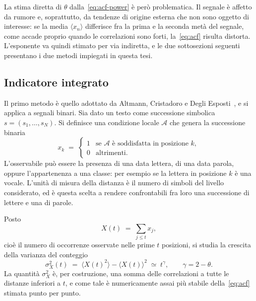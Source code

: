 La stima diretta di $\theta$ dalla~\eqref{eq:acf-power} è però problematica. Il
segnale è affetto da rumore e, soprattutto, da tendenze di origine esterna che
non sono oggetto di interesse: se la media $\langle x_n\rangle$ differisce fra
la prima e la seconda metà del segnale, come accade proprio quando le
correlazioni sono forti, la~\eqref{eq:acf} risulta distorta. L'esponente va
quindi stimato per via indiretta, e le due sottosezioni seguenti presentano i
due metodi impiegati in questa tesi.

\subsection{Indicatore integrato}
\label{sec:integrato}

Il primo metodo è quello adottato da Altmann, Cristadoro e Degli
Esposti~\cite{altmann2012}, e si applica a segnali binari. Sia dato un testo
come successione simbolica $s = (s_1,\dots,s_N)$. Si definisce una condizione
locale $\mathcal{A}$ che genera la successione binaria
\begin{equation}
  x_k \;=\;
  \begin{cases}
    1 & \text{se $\mathcal{A}$ è soddisfatta in posizione $k$},\\
    0 & \text{altrimenti}.
  \end{cases}
  \label{eq:osservabile}
\end{equation}
L'osservabile può essere la presenza di una data lettera, di una data parola,
oppure l'appartenenza a una classe: per esempio se la lettera in posizione $k$ è
una vocale. L'unità di misura della distanza è il numero di simboli del livello
considerato, ed è questa scelta a rendere confrontabili fra loro una successione
di lettere e una di parole.

Posto
\begin{equation}
  X(t) \;=\; \sum_{j \le t} x_j ,
  \label{eq:conteggio}
\end{equation}
cioè il numero di occorrenze osservate nelle prime $t$ posizioni, si studia la
crescita della varianza del conteggio
\begin{equation}
  \sigma_X^2(t) \;=\; \langle X(t)^2\rangle - \langle X(t)\rangle^2
  \;\simeq\; t^{\gamma}, \qquad \gamma = 2 - \theta .
  \label{eq:sigma}
\end{equation}
La quantità $\sigma_X^2$ è, per costruzione, una somma delle correlazioni a
tutte le distanze inferiori a $t$, e come tale è numericamente assai più stabile
della~\eqref{eq:acf} stimata punto per punto.

